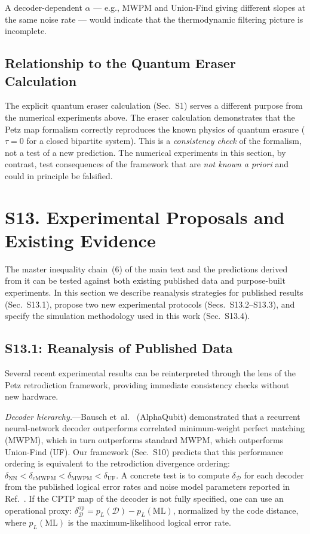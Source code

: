 \documentclass[prl,twocolumn,superscriptaddress,longbibliography]{revtex4-2}
\newcommand{\tauasym}{\tau}
\begin{document}
A decoder-dependent $\alpha$ --- e.g., MWPM and Union-Find
giving different slopes at the same noise rate --- would indicate
that the thermodynamic filtering picture is incomplete.

\subsection{Relationship to the Quantum Eraser Calculation}

The explicit quantum eraser calculation (Sec.~S1) serves a different
purpose from the numerical experiments above. The eraser calculation
demonstrates that the Petz map formalism correctly reproduces the
known physics of quantum erasure ($\tauasym = 0$ for a closed
bipartite system). This is a \emph{consistency check} of the formalism,
not a test of a new prediction. The numerical experiments in this
section, by contrast, test consequences of the framework that are
\emph{not known a priori} and could in principle be falsified.

\section{S13. Experimental Proposals and Existing Evidence}
\label{sec:experiments}

The master inequality chain~(6) of the main text and the predictions
derived from it can be tested against both existing published data and
purpose-built experiments. In this section we describe reanalysis
strategies for published results (Sec.~S13.1), propose two new
experimental protocols (Secs.~S13.2--S13.3), and specify the
simulation methodology used in this work (Sec.~S13.4).

\subsection{S13.1: Reanalysis of Published Data}

Several recent experimental results can be reinterpreted through the
lens of the Petz retrodiction framework, providing immediate
consistency checks without new hardware.

\emph{Decoder hierarchy.}---Bausch et~al.~\cite{Bausch2024}
(AlphaQubit) demonstrated that a recurrent neural-network decoder
outperforms correlated minimum-weight perfect matching (MWPM), which
in turn outperforms standard MWPM, which outperforms Union-Find (UF).
Our framework (Sec.~S10) predicts that this performance ordering is
equivalent to the retrodiction divergence ordering:
$\delta_{\mathrm{NN}} < \delta_{\mathrm{cMWPM}}
< \delta_{\mathrm{MWPM}} < \delta_{\mathrm{UF}}$.
A concrete test is to compute $\delta_{\mathcal{D}}$ for each decoder
from the published logical error rates and noise model parameters
reported in Ref.~\cite{Bausch2024}. If the CPTP map of the decoder
is not fully specified, one can use an operational proxy:
$\delta_{\mathcal{D}}^{\mathrm{op}} = p_L(\mathcal{D}) -
p_L(\mathrm{ML})$, normalized by the code distance, where
$p_L(\mathrm{ML})$ is the maximum-likelihood logical error rate.
\end{document}
